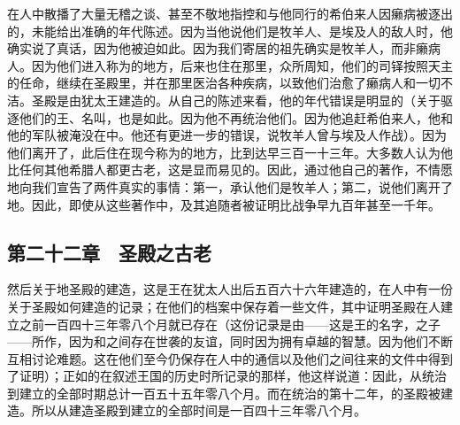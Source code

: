 在人中散播了大量无稽之谈、甚至不敬地指控和与他同行的希伯来人因癞病被逐出的，未能给出准确的年代陈述。因为当他说他们是牧羊人、是埃及人的敌人时，他确实说了真话，因为他被迫如此。因为我们寄居的祖先确实是牧羊人，而非癞病人。因为他们进入称为的地方，后来也住在那里，众所周知，他们的司铎按照天主的任命，继续在圣殿里，并在那里医治各种疾病，以致他们治愈了癞病人和一切不洁。圣殿是由犹太王建造的。从自己的陈述来看，他的年代错误是明显的（关于驱逐他们的王、名叫，也是如此。因为他不再统治他们。因为他追赶希伯来人，他和他的军队被淹没在中。他还有更进一步的错误，说牧羊人曾与埃及人作战）。因为他们离开了，此后住在现今称为的地方，比到达早三百一十三年。大多数人认为他比任何其他希腊人都更古老，这是显而易见的。因此，通过他自己的著作，不情愿地向我们宣告了两件真实的事情：第一，承认他们是牧羊人；第二，说他们离开了地。因此，即使从这些著作中，及其追随者被证明比战争早九百年甚至一千年。\par


\subsection{第二十二章　圣殿之古老}

然后关于地圣殿的建造，这是王在犹太人出后五百六十六年建造的，在人中有一份关于圣殿如何建造的记录；在他们的档案中保存着一些文件，其中证明圣殿在人建立之前一百四十三年零八个月就已存在（这份记录是由——这是王的名字，之子——所作，因为和之间存在世袭的友谊，同时因为拥有卓越的智慧。因为他们不断互相讨论难题。这在他们至今仍保存在人中的通信以及他们之间往来的文件中得到了证明）；正如的在叙述王国的历史时所记录的那样，他这样说道：因此，从统治到建立的全部时期总计一百五十五年零八个月。而在统治的第十二年，的圣殿被建造。所以从建造圣殿到建立的全部时间是一百四十三年零八个月。\par

